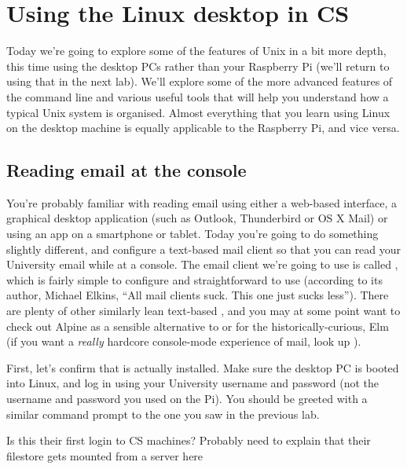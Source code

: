 \chapter{Using the Linux desktop in CS}
\minitoc
{}

Today we're going to explore some of the features of Unix in a bit more depth, this time using the desktop PCs rather than your Raspberry Pi (we'll return to using that in the next lab). We'll explore some of the more advanced features of the command line and various useful tools that will help you understand how a typical Unix system is organised. Almost everything that you learn using Linux on the desktop machine is equally applicable to the Raspberry Pi, and vice versa. 

\section{Reading email at the console}

You're probably familiar with reading email using either a web-based interface, a graphical desktop application (such as Outlook, Thunderbird or OS X Mail) or using an app on a smartphone or tablet. Today you're going to do something slightly different, and configure a text-based mail client so that you can read your University email while at a console. The email client we're going to use is called , which is fairly simple to configure and straightforward to use (according to its author, Michael Elkins, ``All mail clients suck. This one just sucks less''). There are plenty of other similarly lean text-based , and you may at some point want to check out Alpine as a sensible alternative to  or for the historically-curious, Elm (if you want a \textit{really} hardcore console-mode experience of mail, look up ).

First, let's confirm that  is actually installed. Make sure the desktop PC is booted into Linux, and log in using your University username and password (not the username and password you used on the Pi). You should be greeted with a similar command prompt to the one you saw in the previous lab.

\begin{note}
Is this their first login to CS machines? Probably need to explain that their filestore gets mounted from a server here
\end{note}

